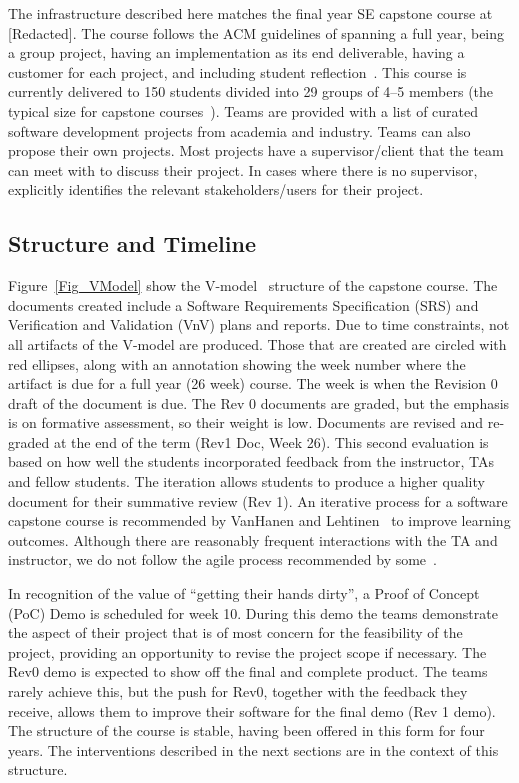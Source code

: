 \documentclass[10pt, conference]{IEEEtran}
\begin{document}
The infrastructure described here matches the final year SE capstone course at
[Redacted]. %
The course follows the ACM guidelines of
spanning a full year, being a group project, having an implementation as its end
deliverable, having a customer for each project, and including student
reflection~\cite{ACM2015}.  This course is currently delivered to 150 students
divided into 29 groups of 4--5 members (the typical size for capstone
courses~\cite{tenhunenSystematicLiteratureReview2023}).  Teams are provided with
a list of curated software development projects from academia and industry.
Teams can also propose their own projects.  Most projects have a
supervisor/client that the team can meet with to discuss their project.  In
cases where there is no supervisor, explicitly identifies the relevant
stakeholders/users for their project.

\subsection{Structure and Timeline} \label{Sec_Structure}

Figure~\ref{Fig_VModel} show the V-model~\cite{ForsbergAndMooz1991} structure of
the capstone course. The documents created include a Software Requirements
Specification (SRS) and Verification and Validation (VnV) plans and reports. Due
to time constraints, not all artifacts of the V-model are produced.  Those that
are created are circled with red ellipses, along with an annotation showing the
week number where the artifact is due for a full year (26 week) course.  The
week is when the Revision 0 draft of the document is due.  The Rev 0 documents
are graded, but the emphasis is on formative assessment, so their weight is low.
Documents are revised and re-graded at the end of the term (Rev1 Doc, Week 26).
This second evaluation is based on how well the students incorporated feedback
from the instructor, TAs and fellow students. The iteration allows students to
produce a higher quality document for their summative review (Rev 1). An
iterative process for a software capstone course is recommended by VanHanen and
Lehtinen~\cite{vanhanenSoftwareEngineeringProblems2014} to improve learning
outcomes. Although there are reasonably frequent interactions with the TA and
instructor, we do not follow the agile process recommended by
some~\cite{stettinaAcademicEducationSoftware2013,
bastarricaWhatCanStudents2017}.

In recognition of the value of ``getting their hands dirty'',
a Proof of Concept (PoC) Demo is scheduled for week 10. During this demo the
teams demonstrate the aspect of their project that is of most concern for the
feasibility of the project, providing an opportunity to revise the project scope
if necessary. The Rev0 demo is expected to show off the final and complete
product. The teams rarely achieve this, but the push for Rev0, together with the
feedback they receive, allows them to improve their software for the final demo
(Rev 1 demo). The structure of the course is stable, having been offered in this
form for four years. The interventions described in the next sections are in the
context of this structure. 
\end{document}
